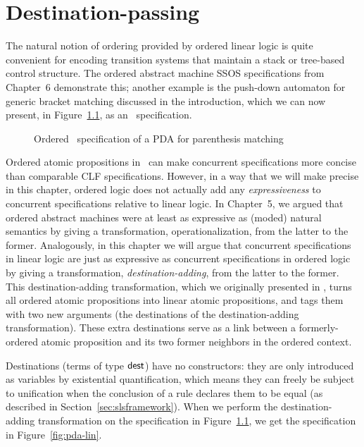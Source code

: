 \chapter{Destination-passing}
\label{chapter-destinations}

The natural notion of ordering provided by ordered linear logic is
quite convenient for encoding transition systems that maintain a stack
or tree-based control structure. The ordered abstract machine SSOS
specifications from Chapter~6 demonstrate this; another example is the
push-down automaton for generic bracket matching discussed in the
introduction, which we can now present, in Figure~\ref{fig:pda-ord},
as an \sls~specification.

\begin{figure}[ht]
\caption{Ordered \sls~specification of a PDA for parenthesis matching}
\label{fig:pda-ord}
\end{figure}

Ordered atomic propositions in \sls~can make concurrent specifications
more concise than comparable CLF specifications. However, in a way
that we will make precise in this chapter, ordered logic does not
actually add any {\it expressiveness} to concurrent specifications
relative to linear logic. In Chapter~5, we argued that ordered
abstract machines were at least as expressive as (moded) natural
semantics by giving a transformation, operationalization, from the
latter to the former. Analogously, in this chapter we will argue that
concurrent specifications in linear logic are just as expressive as
concurrent specifications in ordered logic by giving a transformation,
{\it destination-adding}, from the latter to the former. This
destination-adding transformation, which we originally presented in
\cite{simmons11logical}, turns all ordered atomic propositions into
linear atomic propositions, and tags them with two new arguments (the
destinations of the destination-adding transformation). These extra
destinations serve as a link between a formerly-ordered atomic
proposition and its two former neighbors in the ordered context.

Destinations (terms of type ${\sf dest}$) have no constructors: they
are only introduced as variables by existential quantification, which
means they can freely be subject to unification when the conclusion of
a rule declares them to be equal (as described in
Section~\ref{sec:slsframework}).  When we perform the
destination-adding transformation on the specification in
Figure~\ref{fig:pda-ord}, we get the specification in
Figure~\ref{fig:pda-lin}. 

